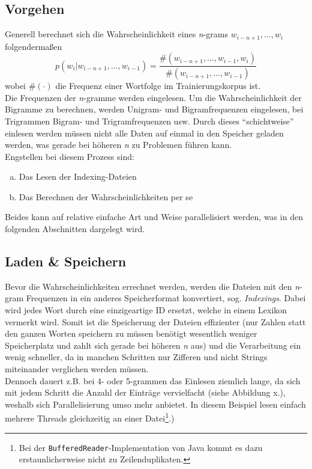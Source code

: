 \documentclass[a4paper,12pt]{scrartcl}
\begin{document}
    \subsection{Vorgehen}

    Generell berechnet sich die Wahrscheinlichkeit eines \emph{n}-grams $w_{i-n+1},\ldots,w_i$ folgendermaßen
    \[p(w_i|w_{i-n+1},\ldots, w_{i-1}) = \frac{\#(w_{i-n+1},\ldots, w_{i-1}, w_i)}{\#(w_{i-n+1},\ldots, w_{i-1})} \]
    wobei $\#(\cdot)$ die Frequenz einer Wortfolge im Trainierungskorpus ist\cite{lm}. \\

    Die Frequenzen der \emph{n}-gramme werden eingelesen. Um die Wahrscheinlichkeit der Bigramme zu berechnen, werden Unigram- und Bigramfrequenzen eingelesen, bei Trigrammen Bigram- und Trigramfrequenzen usw. Durch dieses ``schichtweise'' einlesen werden müssen nicht alle Daten auf einmal in den Speicher geladen werden, was gerade bei höheren \emph{n} zu Problemen führen kann. \\
    Engstellen bei diesem Prozess sind:
    \begin{enumerate}[a)]
        \item Das Lesen der Indexing-Dateien
        \item Das Berechnen der Wahrscheinlichkeiten per se
    \end{enumerate}
    Beides kann auf relative einfache Art und Weise parallelisiert werden, was in den folgenden Abschnitten dargelegt wird.

    \subsection{Laden \& Speichern}

    Bevor die Wahrscheinlichkeiten errechnet werden, werden die Dateien mit den \emph{n}-gram Frequenzen in ein anderes Speicherformat konvertiert, sog. \emph{Indexings}. Dabei wird jedes Wort durch eine einzigeartige ID ersetzt, welche in einem Lexikon vermerkt wird. Somit ist die Speicherung der Dateien effizienter (nur Zahlen statt den ganzen Worten speichern zu müssen benötigt wesentlich weniger Speicherplatz und zahlt sich gerade bei höheren \emph{n} aus) und die Verarbeitung ein wenig schneller, da in manchen Schritten nur Zifferen und nicht Strings miteinander verglichen werden müssen. \\
    Dennoch dauert z.B. bei 4- oder 5-grammen das Einlesen ziemlich lange, da sich mit jedem Schritt die Anzahl der Einträge vervielfacht (siehe Abbildung x.), weshalb sich Parallelisierung umso mehr anbietet. In diesem Beispiel lesen einfach mehrere Threads gleichzeitig an einer Datei\footnote{Bei der {\tt BufferedReader}-Implementation von Java kommt es dazu erstaunlicherweise nicht zu Zeilenduplikaten.}.)
\end{document}
